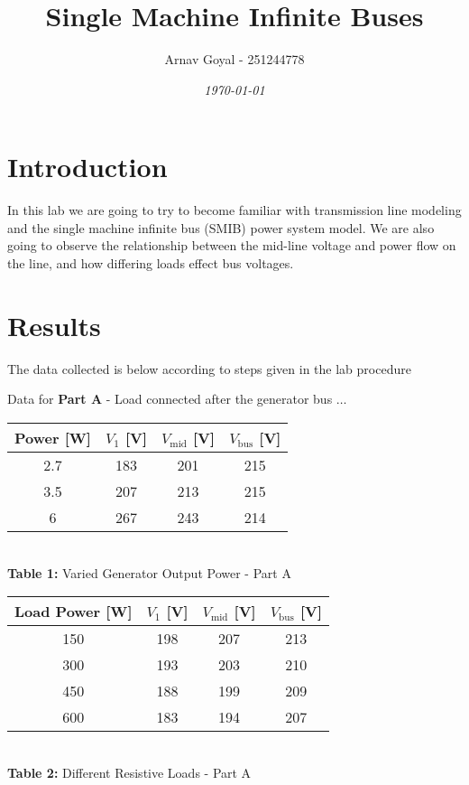 \documentclass[]{report}
\title{\textbf{Single Machine Infinite Buses}}
\date{\textit{\today}}
\author{Arnav Goyal - 251244778}
\begin{document}
	
\maketitle

\section*{Introduction}

In this lab we are going to try to become familiar with transmission line modeling and the single machine infinite bus (SMIB) power system model. We are also going to observe the relationship between the mid-line voltage and power flow on the line, and how differing loads effect bus voltages.

\section*{Results}

The data collected is below according to steps given in the lab procedure

Data for \textbf{Part A} - Load connected after the generator bus $\ldots$

\begin{table}[h] \centering
	\begin{tabular}{@{}cccc@{}}
		\toprule
		Power [W] 	& $V_1$ [V] & $V_\text{mid}$  [V]& $V_\text{bus}$ [V] \\ \midrule
		2.7   	&   183 	&  201    		&  215    		\\
	  		3.5  	&  207  	&      213		&      215		\\
			6 	&   267 	&  	243    		& 214      		\\ \bottomrule
	\end{tabular} \\ \vspace{1em}
	\textbf{Table 1:} Varied Generator Output Power - Part A
\end{table}

\begin{table}[h] \centering
	\begin{tabular}{@{}cccc@{}}
		\toprule
		Load Power [W] 	& $V_1$ [V] & $V_\text{mid}$  [V]& $V_\text{bus}$ [V] \\ \midrule
		150   	&   198 	&  207    		&  213    		\\
		300  	&  193  	&      203		&      210		\\
		450  	&  188  	&      199		&      209		\\
		600 	&   183 	&  	194    		& 207     		\\ \bottomrule
	\end{tabular} \\ \vspace{1em}
	\textbf{Table 2:} Different Resistive Loads - Part A
\end{table}
\end{document}
